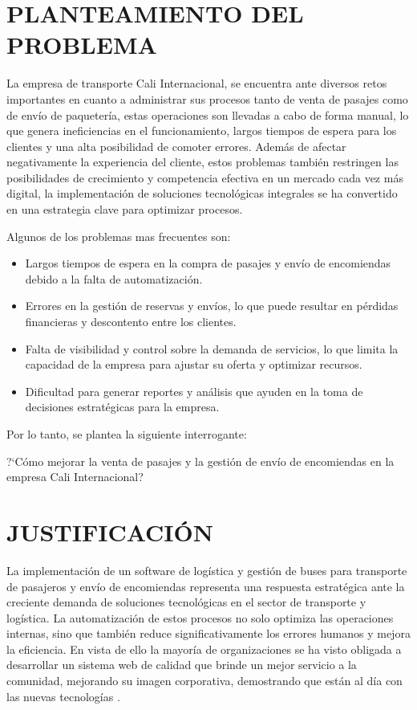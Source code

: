 \documentclass[12pt,letterpaper]{article}
\begin{document}
\section{PLANTEAMIENTO DEL PROBLEMA}

La empresa de transporte Cali Internacional, se encuentra ante diversos retos importantes en cuanto a administrar sus procesos tanto de venta de pasajes como de envío de paquetería, estas operaciones son llevadas a cabo de forma manual, lo que genera ineficiencias en el funcionamiento, largos tiempos de espera para los clientes y una alta posibilidad de comoter errores. Además de afectar negativamente la experiencia del cliente, estos problemas también restringen las posibilidades de crecimiento y competencia efectiva en un mercado cada vez más digital, la implementación de soluciones tecnológicas integrales se ha convertido en una estrategia clave para optimizar procesos.  

Algunos de los problemas mas frecuentes son:

\begin{itemize}[label=$\bullet$, left=1.25cm, labelsep = 0.75cm, topsep = 0pt, parsep = 0pt]
	\item Largos tiempos de espera en la compra de pasajes y envío de encomiendas debido a la falta de automatización.
	\item Errores en la gestión de reservas y envíos, lo que puede resultar en pérdidas financieras y descontento entre los clientes.
	\item Falta de visibilidad y control sobre la demanda de servicios, lo que limita la capacidad de la empresa para ajustar su oferta y optimizar recursos.
	\item Dificultad para generar reportes y análisis que ayuden en la toma de decisiones estratégicas para la empresa.    
\end{itemize}

Por lo tanto, se plantea la siguiente interrogante:

?`Cómo mejorar la venta de pasajes y la gestión de envío de encomiendas en la empresa Cali Internacional?

\section{JUSTIFICACIÓN}

La implementación de un software de logística y gestión de buses para transporte de pasajeros y envío de encomiendas representa una respuesta estratégica ante la creciente demanda de soluciones tecnológicas en el sector de transporte y logística. La automatización de estos procesos no solo optimiza las operaciones internas, sino que también reduce significativamente los errores humanos y mejora la eficiencia. En vista de ello la mayoría de organizaciones se ha visto obligada a desarrollar un sistema web de calidad que brinde un mejor servicio a la comunidad, mejorando su imagen corporativa, demostrando que están al día con las nuevas tecnologías \parencite{nunez2005diseno}.
\end{document}
